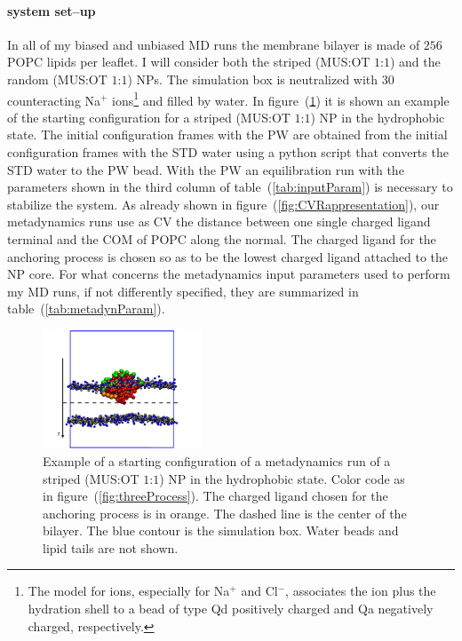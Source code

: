 \paragraph{\textbf{system set--up}} In all of my biased and unbiased \ac{MD} runs the membrane bilayer is made of 
$256$ \ac{POPC} lipids per leaflet. I will consider both the striped (\ac{MUS}:\ac{OT} $1$:$1$) and the random 
(\ac{MUS}:\ac{OT} $1$:$1$) \acp{NP}. The simulation box is neutralized with $30$ counteracting Na$^+$ 
ions\footnote{The \martini{} model for ions, especially for Na$^+$ and Cl$^-$, associates the ion plus the 
hydration shell to a bead of type Qd positively charged and Qa negatively charged, respectively.} and filled by 
water. In figure~(\ref{fig:startFrameHydro}) it is shown an example of the starting configuration for a striped 
(\ac{MUS}:\ac{OT} $1$:$1$) \ac{NP} in the hydrophobic state. The initial configuration frames with the \ac{PW} are 
obtained from the initial configuration frames with the \ac{STD} \martini{} water using a python script that 
converts the \ac{STD} \martini{} water to the \ac{PW} bead. With the \ac{PW} an equilibration run with the 
parameters shown in the third column of table~(\ref{tab:inputParam}) is necessary to stabilize the system. As 
already shown in figure~(\ref{fig:CVRappresentation}), our metadynamics runs use as \ac{CV} the distance between 
one single charged ligand terminal and the \ac{COM} of \ac{POPC} along the normal. The charged ligand for the 
anchoring process is chosen so as to be the lowest charged ligand attached to the \ac{NP} core. For what concerns 
the metadynamics input parameters used to perform my \ac{MD} runs, if not differently specified, they are 
summarized in table~(\ref{tab:metadynParam}).
\begin{figure}
	\centering
	\includegraphics[width=0.42\textwidth]{./img/patchedHydrophobic.pdf}
	\caption{Example of a starting configuration of a metadynamics run of a striped (\ac{MUS}:\ac{OT} $1$:$1$) \ac{NP} in the hydrophobic state. Color code as in figure~(\ref{fig:threeProcess}). The charged ligand chosen for the anchoring process is in orange. The dashed line is the center of the bilayer. The blue contour is the simulation box. Water beads and lipid tails are not shown.}%
	\label{fig:startFrameHydro}
\end{figure}

